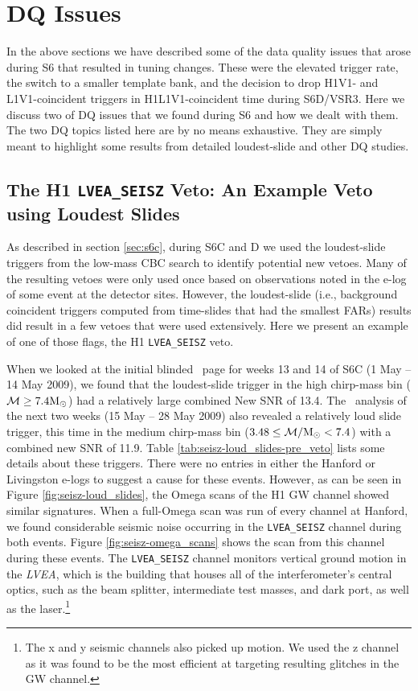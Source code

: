 \section{DQ Issues}
\label{sec:dq_issues}

In the above sections we have described some of the data quality issues that
arose during S6 that resulted in tuning changes. These were the elevated
trigger rate, the switch to a smaller template bank, and the decision to drop
H1V1- and L1V1-coincident triggers in H1L1V1-coincident time during S6D/VSR3.
Here we discuss two of \ac{DQ} issues that we found during \ac{S6} and how we
dealt with them. The two \ac{DQ} topics listed here are by no means exhaustive.
They are simply meant to highlight some results from detailed loudest-slide and
other DQ studies.

\subsection{The H1 \texttt{LVEA\_SEISZ} Veto: An Example Veto using Loudest Slides}
\label{sec:lvea_seismic}

As described in section \ref{sec:s6c}, during S6C and D we used the
loudest-slide triggers from the low-mass \ac{CBC} search to identify potential
new vetoes. Many of the resulting vetoes were only used once based on
observations noted in the e-log of some event at the detector sites. However,
the loudest-slide (i.e., background coincident triggers computed from
time-slides that had the smallest \acp{FAR}) results did result in a few vetoes
that were used extensively. Here we present an example of one of those flags,
the H1 \verb|LVEA_SEISZ| veto.

When we looked at the initial blinded \ihope~page for weeks 13 and 14 of S6C (1
May -- 14 May 2009), we found that the loudest-slide trigger in the high
chirp-mass bin ($\mathcal{M} \geq 7.4\mathrm{M_\odot}$) had a relatively large combined New
\ac{SNR} of 13.4. The \ihope~analysis of the next two weeks (15 May -- 28 May
2009) also revealed a relatively loud slide trigger, this time in the medium
chirp-mass bin ($3.48 \leq \mathcal{M}/\mathrm{M_\odot} < 7.4$) with a combined new \ac{SNR} of
11.9. Table \ref{tab:seisz-loud_slides-pre_veto} lists some details about these
triggers. There were no entries in either the Hanford or Livingston e-logs to
suggest a cause for these events. However, as can be seen in Figure
\ref{fig:seisz-loud_slides}, the Omega scans of the H1 \ac{GW} channel showed
similar signatures. When a full-Omega scan was run of every channel at Hanford,
we found considerable seismic noise occurring in the \verb|LVEA_SEISZ| channel
during both events. Figure \ref{fig:seisz-omega_scans} shows the scan from this
channel during these events. The \verb|LVEA_SEISZ| channel monitors vertical
ground motion in the \emph{LVEA}, which is the building that houses all of the
interferometer's central optics, such as the beam splitter, intermediate test
masses, and dark port, as well as the laser.\footnote{The x and y seismic
channels also picked up motion. We used the z channel as it was found to be the
most efficient at targeting resulting glitches in the \ac{GW} channel.}

